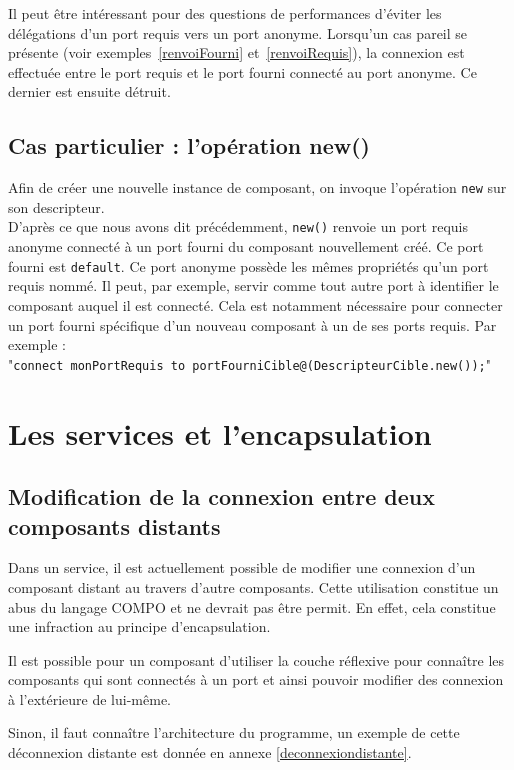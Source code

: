 \documentclass[11pt,a4paper,openany,oneside]{book}
\begin{document}
Il peut être intéressant pour des questions de performances d'éviter les délégations d'un port requis vers un port anonyme. Lorsqu'un cas pareil se présente (voir exemples~\ref{renvoiFourni} et~\ref{renvoiRequis}), la connexion est effectuée entre le port requis et le port fourni connecté au port anonyme. Ce dernier est ensuite détruit.

\subsection{Cas particulier : l'opération new()}
Afin de créer une nouvelle instance de composant, on invoque l'opération \texttt{new} sur son descripteur.\\
D'après ce que nous avons dit précédemment, \texttt{new()} renvoie un port requis anonyme connecté à un port fourni du composant nouvellement créé. Ce port fourni est \texttt{default}.
Ce port anonyme possède les mêmes propriétés qu'un port requis nommé. Il peut, par exemple, servir comme tout autre port à identifier le composant auquel il est connecté. Cela est notamment nécessaire pour connecter un port fourni spécifique d'un nouveau composant à un de ses ports requis. Par exemple : \\
"\texttt{connect monPortRequis to portFourniCible@(DescripteurCible.new());}"

\section{Les services et l'encapsulation}

\subsection{Modification de la connexion entre deux composants distants}
\label{serviceEncapsulationRef}
Dans un service, il est actuellement possible de modifier une connexion d'un composant distant au travers d'autre composants.
Cette utilisation constitue un abus du langage COMPO et ne devrait pas être permit. En effet, cela constitue une infraction au principe d'encapsulation. 

Il est possible pour un composant d'utiliser la couche réflexive pour connaître les composants qui sont connectés à un port et ainsi pouvoir modifier des connexion à l'extérieure de lui-même. 

Sinon, il faut connaître l'architecture du programme, un exemple de cette déconnexion distante est donnée en annexe \ref{deconnexiondistante}.
\end{document}
